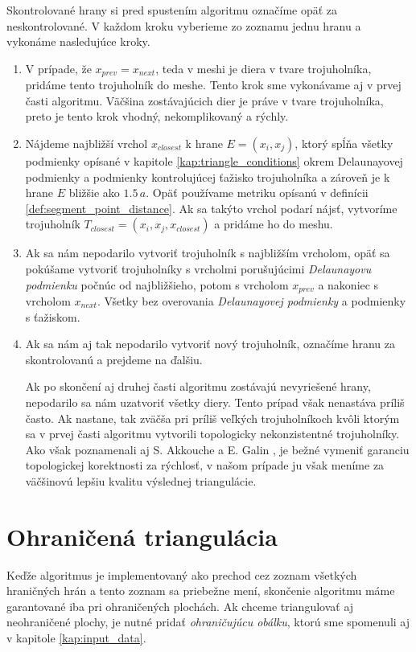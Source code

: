 Skontrolované hrany si pred spustením algoritmu označíme opäť za neskontrolované. V každom kroku vyberieme
zo zoznamu jednu hranu a vykonáme nasledujúce kroky.
\begin{enumerate}
    \item{
        V prípade, že $x_{prev} = x_{next}$, teda v meshi je diera v tvare trojuholníka, pridáme tento 
        trojuholník do meshe. Tento krok sme vykonávame aj v prvej časti algoritmu. Väčšina zostávajúcich
        dier je práve v tvare trojuholníka, preto je tento krok vhodný, nekomplikovaný a rýchly.
    }
    \item{
        Nájdeme najbližší vrchol $x_{closest}$ k hrane $E = (x_i, x_j)$, ktorý spĺňa všetky podmienky 
        opísané v kapitole \ref{kap:triangle_conditions} okrem Delaunayovej podmienky a podmienky 
        kontrolujúcej ťažisko trojuholníka a zároveň je k hrane $E$ bližšie ako $1.5 \, a$. 
        Opäť používame metriku 
        opísanú v definícii \ref{def:segment_point_distance}. Ak sa takýto vrchol podarí nájsť, 
        vytvoríme trojuholník $T_{closest} = (x_i, x_j, x_{closest})$ a pridáme ho do meshu.
    }
    \item{
        Ak sa nám nepodarilo vytvoriť trojuholník s najbližším vrcholom, opäť sa pokúšame vytvoriť 
        trojuholníky s vrcholmi porušujúcimi \textit{Delaunayovu podmienku} počnúc od najbližšieho, 
        potom s vrcholom $x_{prev}$
        a nakoniec s vrcholom $x_{next}$. Všetky bez overovania \textit{Delaunayovej podmienky} a 
        podmienky s ťažiskom.
    }
    \item{
        Ak sa nám aj tak nepodarilo vytvoriť nový trojuholník, označíme hranu za skontrolovanú a prejdeme
        na ďalšiu.
    }
    
    Ak po skončení aj druhej časti algoritmu zostávajú nevyriešené hrany, nepodarilo sa nám 
    uzatvoriť všetky diery. Tento prípad však nenastáva príliš často. Ak nastane, tak zväčša pri 
    príliš veľkých trojuholníkoch kvôli ktorým sa v prvej časti algoritmu vytvorili topologicky
    nekonzistentné trojuholníky. Ako však poznamenali aj S. Akkouche a E. Galin 
    \cite{akkouche2001adaptive}, je bežné vymeniť garanciu topologickej korektnosti za rýchlosť, 
    v našom prípade ju však meníme za väčšinovú lepšiu kvalitu výslednej triangulácie. 
\end{enumerate}

\section{Ohraničená triangulácia}
Keďže algoritmus je implementovaný ako prechod cez zoznam všetkých hraničných hrán a tento zoznam 
sa priebežne mení, skončenie algoritmu máme garantované iba pri ohraničených plochách.
Ak chceme triangulovať aj neohraničené plochy, je nutné pridať \textit{ohraničujúcu obálku}, 
ktorú sme spomenuli aj v kapitole \ref{kap:input_data}.

